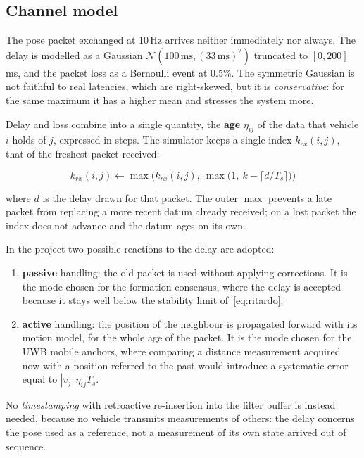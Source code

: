 \documentclass[conference,9pt]{IEEEtran}
\begin{document}
\subsection{Channel model}

The pose packet exchanged at 10\,Hz arrives neither immediately nor always. The
delay is modelled as a Gaussian $\mathcal{N}(100\,\mathrm{ms},
(33\,\mathrm{ms})^2)$ truncated to $[0, 200]$\,ms, and the packet loss as a
Bernoulli event at 0.5\%. The symmetric Gaussian is not faithful to real
latencies, which are right-skewed, but it is \emph{conservative}: for the same
maximum it has a higher mean and stresses the system more.

Delay and loss combine into a single quantity, the \textbf{age} $\eta_{ij}$ of
the data that vehicle $i$ holds of $j$, expressed in steps. The simulator keeps
a single index $k_{rx}(i,j)$, that of the freshest packet received:

\begin{equation}
k_{rx}(i,j) \gets \max\Big(k_{rx}(i,j),\ \max\big(1,\ k - \lceil d/T_s \rceil\big)\Big)
\label{eq:krx}
\end{equation}

where $d$ is the delay drawn for that packet. The outer $\max$ prevents a late
packet from replacing a more recent datum already received; on a lost packet
the index does not advance and the datum ages on its own.

In the project two possible reactions to the delay are adopted:
\begin{enumerate}
\item \textbf{passive} handling: the old packet is used without applying
      corrections. It is the mode chosen for the formation consensus, where the
      delay is accepted because it stays well below the stability limit
      of~\eqref{eq:ritardo};
\item \textbf{active} handling: the position of the neighbour is propagated
      forward with its motion model, for the whole age of the packet. It is the
      mode chosen for the UWB mobile anchors, where comparing a distance
      measurement acquired now with a position referred to the past would
      introduce a systematic error equal to $|v_j|\,\eta_{ij} T_s$.
\end{enumerate}

No \emph{timestamping} with retroactive re-insertion into the filter buffer is
instead needed, because no vehicle transmits measurements of others: the delay
concerns the pose used as a reference, not a measurement of its own state
arrived out of sequence.
\end{document}

